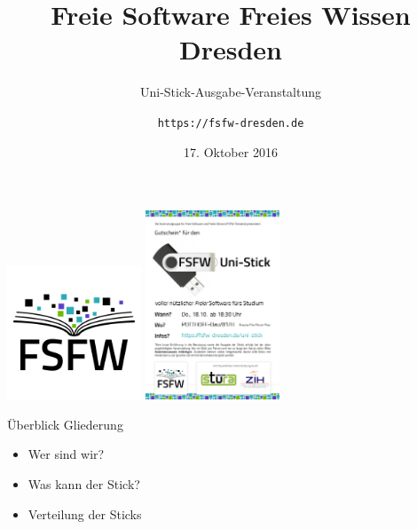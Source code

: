 \documentclass[t]{beamer}
\title{Freie Software Freies Wissen Dresden}
\subtitle{Uni-Stick-Ausgabe-Veranstaltung}
\author{\texttt{https://fsfw-dresden.de}}
\date{17. Oktober 2016}
\begin{document}
\begin{frame}[label=p1]
  \begin{center}%
\vspace*{-1em}  
\includegraphics[width=4cm]{img-src/fsfw-logo-with-text}
\hspace{1cm}
\includegraphics[width=4cm]{img-src/gutschein-seite-1}\\
\vspace{1em}
  \end{center}
\end{frame}


\begin{frame}[label=ol]{\color{fg}Überblick}
 Gliederung 
  \begin{itemize}
  \item Wer sind wir?
  \item Was kann der Stick?
  \item Verteilung der Sticks
  \end{itemize}  
\end{frame}

\end{document}
